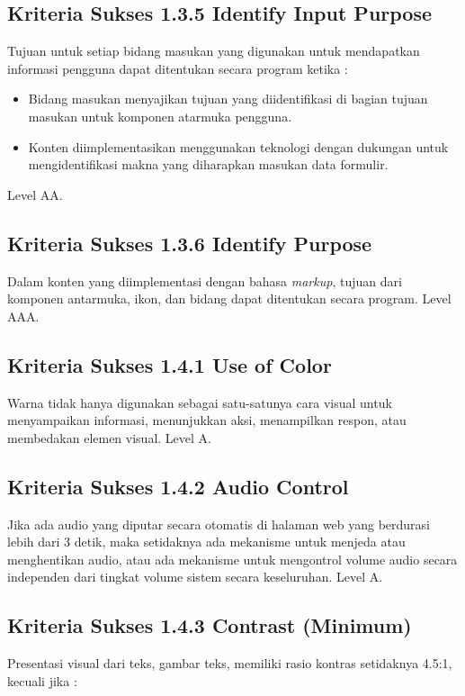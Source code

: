 \subsection{Kriteria Sukses 1.3.5 Identify Input Purpose}
\label{sec:kriteria_1.3.5}
Tujuan untuk setiap bidang masukan yang digunakan untuk mendapatkan informasi pengguna dapat ditentukan secara program ketika :

\begin{itemize}
	\item Bidang masukan menyajikan tujuan yang diidentifikasi di bagian tujuan masukan untuk komponen atarmuka pengguna.
	\item Konten diimplementasikan menggunakan teknologi dengan dukungan untuk mengidentifikasi makna yang diharapkan masukan data formulir.
\end{itemize}

Level AA.

\subsection{Kriteria Sukses 1.3.6 Identify Purpose}
\label{sec:kriteria_1.3.6}
Dalam konten yang diimplementasi dengan bahasa \textit{markup}, tujuan dari komponen antarmuka, ikon, dan bidang dapat ditentukan secara program.
Level AAA.

\subsection{Kriteria Sukses 1.4.1 Use of Color}
\label{sec:kriteria_1.4.1}
Warna tidak hanya digunakan sebagai satu-satunya cara visual untuk menyampaikan informasi, menunjukkan aksi, menampilkan respon, atau membedakan elemen visual.
Level A.

\subsection{Kriteria Sukses 1.4.2 Audio Control}
\label{sec:kriteria_1.4.2}
Jika ada audio yang diputar secara otomatis di halaman web yang berdurasi lebih dari 3 detik, maka setidaknya ada mekanisme untuk menjeda atau menghentikan audio, atau ada mekanisme untuk mengontrol volume audio secara independen dari tingkat volume sistem secara keseluruhan.
Level A.

\subsection{Kriteria Sukses 1.4.3 Contrast (Minimum)}
\label{sec:kriteria_1.4.3}
Presentasi visual dari teks, gambar teks, memiliki rasio kontras setidaknya 4.5:1, kecuali jika :

